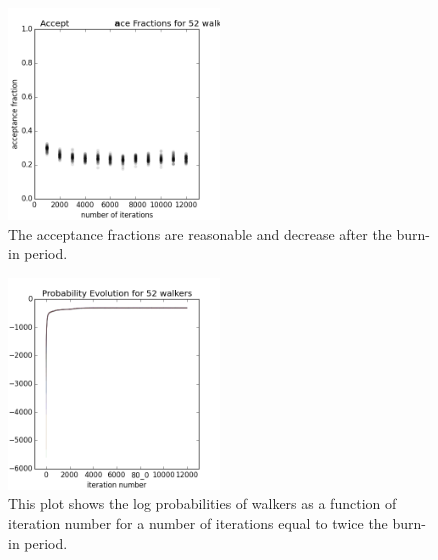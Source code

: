\documentclass[preprint]{aastex}
\begin{document}
\begin{figure}
\includegraphics[width=0.5\textwidth]{fracs-toy.png}
\caption{The acceptance fractions are reasonable and decrease after the burn-in period.}
\label{fig:dumbestfrac}
\end{figure}

\begin{figure}
\includegraphics[width=0.5\textwidth]{probs-toy.png}
\caption{This plot shows the log probabilities of walkers as a function of iteration number for a number of iterations equal to twice the burn-in period.}
\label{fig:dumbestprob}
\end{figure}
\end{document}
